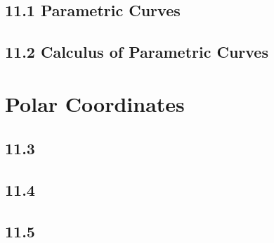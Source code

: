 \documentclass{article}
\begin{document}
        \subsection*{11.1 Parametric Curves}
        \subsection*{11.2 Calculus of Parametric Curves}
    \section{Polar Coordinates}
        \subsection*{11.3}
        \subsection*{11.4}
        \subsection*{11.5}
        \color{Aquamarine}
\end{document}
